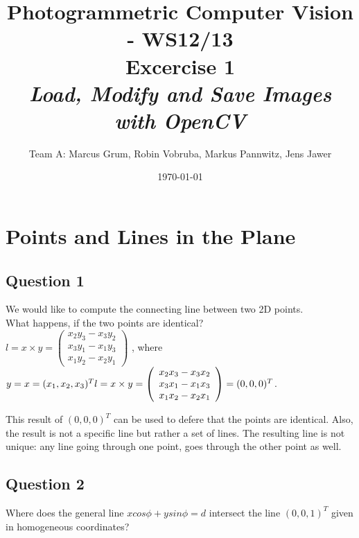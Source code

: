 \documentclass[a4paper,headings=small]{scrartcl}
\title{Photogrammetric Computer Vision - WS12/13 \\ Excercise 1 \\ \emph{Load, Modify and Save Images with OpenCV}}
\author{Team A: Marcus Grum, Robin Vobruba, Markus Pannwitz, Jens Jawer}
\date{\today}
\numberwithin{equation}{section} %
\numberwithin{figure}{section}   %
\begin{document}
\maketitle



\section{Points and Lines in the Plane}


\subsection{Question 1}


We would like to compute the connecting line between two 2D points. \\
What happens, if the two points are identical? \\

$l = x \times y =
\left( \begin{array}{c}
x_2 y_3 - x_3 y_2 \\
x_3 y_1 - x_1 y_3 \\
x_1 y_2 - x_2 y_1
\end{array} \right)$
, where $y = x = (x_1, x_2, x_3)^T \\
l = x \times y =
\left( \begin{array}{c}
x_2 x_3 - x_3 x_2\\
x_3 x_1 - x_1 x_3\\
x_1 x_2 - x_2 x_1\end{array} \right) = (0, 0, 0)^T$.

This result of $(0, 0, 0)^T$ can be used to defere that the points are identical.
Also, the result is not a specific line but rather a set of lines.
The resulting line is not unique:
any line going through one point, goes through the other point as well.



\subsection{Question 2}

Where does the general line $ x cos \phi + y sin \phi = d$ intersect the line $(0, 0, 1)^T$
given in homogeneous coordinates?
\end{document}
